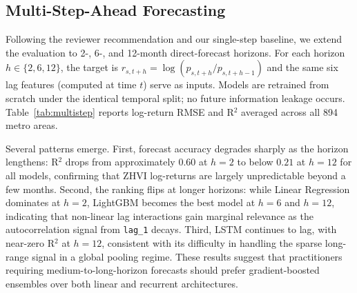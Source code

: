 \documentclass[runningheads]{llncs}
\begin{document}
\subsection{Multi-Step-Ahead Forecasting}
\label{sec:multistep}

Following the reviewer recommendation and our single-step baseline, we extend the evaluation to 2-, 6-, and 12-month direct-forecast horizons. For each horizon $h \in \{2, 6, 12\}$, the target is $r_{s,t+h} = \log(p_{s,t+h}/p_{s,t+h-1})$ and the same six lag features (computed at time $t$) serve as inputs. Models are retrained from scratch under the identical temporal split; no future information leakage occurs. Table~\ref{tab:multistep} reports log-return RMSE and R$^2$ averaged across all 894 metro areas.

\begin{table}[!ht]
\caption{Multi-step-ahead log-return RMSE and R$^2$ for $h \in \{2, 6, 12\}$ months. Bold denotes the best result per column.}
\label{tab:multistep}
\centering
{}
\end{table}

Several patterns emerge. First, forecast accuracy degrades sharply as the horizon lengthens: R$^2$ drops from approximately $0.60$ at $h=2$ to below $0.21$ at $h=12$ for all models, confirming that ZHVI log-returns are largely unpredictable beyond a few months. Second, the ranking flips at longer horizons: while Linear Regression dominates at $h=2$, LightGBM becomes the best model at $h=6$ and $h=12$, indicating that non-linear lag interactions gain marginal relevance as the autocorrelation signal from \texttt{lag\_1} decays. Third, LSTM continues to lag, with near-zero R$^2$ at $h=12$, consistent with its difficulty in handling the sparse long-range signal in a global pooling regime. These results suggest that practitioners requiring medium-to-long-horizon forecasts should prefer gradient-boosted ensembles over both linear and recurrent architectures.
\end{document}
